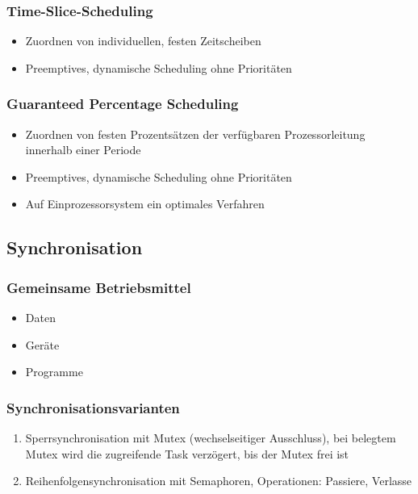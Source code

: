 \subsubsection{Time-Slice-Scheduling}
\begin{itemize}
	\item Zuordnen von individuellen, festen Zeitscheiben
	\item Preemptives, dynamische Scheduling ohne Prioritäten
\end{itemize}

\subsubsection{Guaranteed Percentage Scheduling}
\begin{itemize}
	\item Zuordnen von festen Prozentsätzen der verfügbaren Prozessorleitung innerhalb einer Periode
	\item Preemptives, dynamische Scheduling ohne Prioritäten
	\item Auf Einprozessorsystem ein optimales Verfahren
\end{itemize}


\subsection{Synchronisation}

\subsubsection{Gemeinsame Betriebsmittel}
\begin{itemize}
	\item Daten
	\item Geräte
	\item Programme
\end{itemize}

\subsubsection{Synchronisationsvarianten}
\begin{enumerate}
	\item Sperrsynchronisation mit Mutex (wechselseitiger Ausschluss), bei belegtem Mutex wird die zugreifende Task verzögert, bis der Mutex frei ist
	\item Reihenfolgensynchronisation mit Semaphoren, Operationen: Passiere, Verlasse
\end{enumerate}

